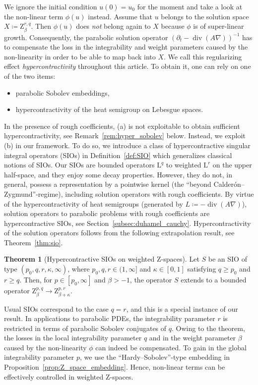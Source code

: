 \documentclass[11pt, leqno]{amsart}
\theoremstyle{definition}
\newtheorem*{theorem-nonum}{Theorem}
\renewcommand{\L}{\mathrm{L}}
\newcommand{\Z}{\mathrm{Z}}
\DeclareMathOperator{\Div}{div}
\begin{document}
	We ignore the initial condition $u(0) = u_0$ for the moment and take a look at the non-linear term $\phi(u)$ instead. Assume that $u$ belongs to the solution space $X \coloneqq \Z^{r,q}_\beta$. Then $\phi(u)$ does \emph{not} belong again to $X$ because $\phi$ is of super-linear growth. Consequently, the parabolic solution operator $(\partial_t - \Div(A\nabla))^{-1}$ has to compensate the loss in the integrability and weight parameters caused by the non-linearity in order to be able to map back into $X$. We call this regularizing effect \emph{hypercontractivity} throughout this article.
	To obtain it, one can rely on one of the two items:
	\begin{itemize}
		\item[(a)] parabolic Sobolev embeddings,
		\item[(b)] hypercontractivity of the heat semigroup on Lebesgue spaces.
	\end{itemize}
	In the presence of rough coefficients, (a) is not exploitable to obtain sufficient hypercontractivity, see Remark~\ref{rem:hyper_sobolev} below. Instead, we exploit (b) in our framework. To do so, we introduce a class of hypercontractive singular integral operators (SIOs) in Definition~\ref{def:SIO} which generalizes classical notions of SIOs.
	Our SIOs are bounded operators $\L^q$ to weighted $\L^r$ on the upper half-space, and they enjoy some decay properties. However, they do not, in general, possess a representation by a pointwise kernel (the \enquote{beyond Calderón--Zygmund}-regime), including solution operators with rough coefficients.
	By virtue of the hypercontractivity of heat semigroups (generated by $L \coloneqq - \Div(A\nabla)$), solution operators to parabolic problems with rough coefficients are hypercontractive SIOs, see Section~\ref{subsec:duhamel_cauchy}.
	Hypercontractivity of the solution operators follows from the following extrapolation result, see Theorem~\ref{thm:sio}.

	\begin{theorem-nonum}[Hypercontractive SIOs on weighted $\Z$-spaces]
		Let $S$ be an SIO of type $(p_0,q,r,\kappa,\infty)$, where $p_0,q,r\in (1,\infty]$ and $\kappa \in [0,1]$ satisfying $q \geq p_0$ and $r \geq q$. Then, for $p \in [p_0, \infty]$ and $\beta > -1$, the operator $S$ extends to a bounded operator $\Z^{p,q}_\beta \to \Z^{p,r}_{\beta + \kappa}$.
	\end{theorem-nonum}

	Usual SIOs correspond to the case $q = r$, and this is a special instance of our result.
	In applications to parabolic PDEs, the integrability parameter $r$ is restricted in terms of parabolic Sobolev conjugates of $q$.
	Owing to the theorem, the losses in the local integrability parameter $q$ and in the weight parameter $\beta$ caused by the non-linearity $\phi$ can indeed be compensated. To gain in the global integrability parameter $p$, we use the \enquote{Hardy--Sobolev}-type embedding in Proposition~\ref{prop:Z_space_embedding}.
	Hence, non-linear terms can be effectively controlled in weighted $\Z$-spaces.
\end{document}

